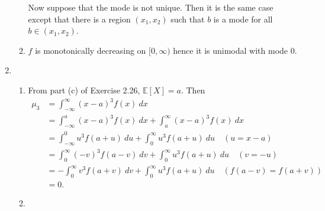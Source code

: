 \documentclass{article}
\begin{document}
\begin{enumerate}
\begin{enumerate}
        Now suppose that the mode is not unique. Then it is the same case except that there is a region 
        $(x_1, x_2)$ such that $b$ is a mode for all $b \in (x_1, x_2)$.

        \item $f$ is monotonically decreasing on $[0, \infty)$ hence it is unimodal with mode 0.
    \end{enumerate}

    \item \begin{enumerate}
        \item From part (c) of Exercise 2.26, $\mathbb{E}[X] = a$. Then 
        \begin{align*}
            \mu_3
            &= \int_{-\infty}^{\infty} (x - a)^3 f(x) \ dx \\
            &= \int_{-\infty}^{a} (x - a)^3 f(x) \ dx + \int_{a}^{\infty} (x - a)^3 f(x) \ dx \\
            &= \int_{-\infty}^{0} u^3 f(a + u) \ du + \int_{0}^{\infty} u^3 f(a + u) \ du \quad 
            (u = x - a) \\
            &= \int_{0}^{\infty} (-v)^3 f(a - v) \ dv + \int_{0}^{\infty} u^3 f(a + u) \ du \quad
            (v = -u) \\
            &= -\int_{0}^{\infty} v^3 f(a + v) \ dv + \int_{0}^{\infty} u^3 f(a + u) \ du \quad 
            (f(a - v) = f(a + v)) \\
            &= 0.
        \end{align*}

        \item 
    \end{enumerate}

\end{enumerate}
\end{document}
